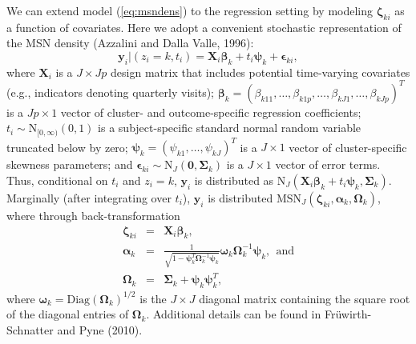 \documentclass[useAMS,referee]{biom}
\begin{document}
We can extend model (\ref{eq:msndens}) to the regression setting by modeling $\boldsymbol\zeta_{ki}$ as a function of covariates. Here we adopt a convenient stochastic representation of the MSN density (Azzalini and Dalla Valle, 1996):
\begin{equation}
\mathbf{y}_{i}|(z_i=k,t_i) = \mathbf{X}_i \boldsymbol\beta_k + t_i \boldsymbol\psi_k + \boldsymbol\epsilon_{ki}, \label{eq:msnreg}
\end{equation}
where 
$\mathbf{X}_i$ is a $J \times Jp$ design matrix that includes potential time-varying covariates (e.g., indicators denoting quarterly visits); $\boldsymbol{\beta}_k=(\beta_{k11},\ldots,\beta_{k1p},\ldots,\beta_{kJ1},\ldots,\beta_{kJp})^T$ is a $Jp\times 1$ vector of cluster- and outcome-specific regression coefficients; $t_i\sim \text{N}_{[0,\infty)}(0,1)$ is a subject-specific standard normal random variable truncated below by zero; $\boldsymbol\psi_k=(\psi_{k1},\ldots,\psi_{kJ})^T$ is a $J \times 1$ vector of cluster-specific skewness parameters; and $\boldsymbol{\epsilon}_{ki} \sim \text{N}_J(\boldsymbol0,\boldsymbol\Sigma_k)$ is a $J\times 1$ vector of error terms. Thus, conditional on $t_i$ and $z_i=k$, $\boldsymbol{y}_i$ is distributed as $\text{N}_J(\mathbf{X}_i \boldsymbol\beta_k + t_i \boldsymbol\psi_k, \boldsymbol{\Sigma}_k)$. Marginally (after integrating over $t_i$), $\mathbf{y}_i$ is distributed $\text{MSN}_J(\boldsymbol\zeta_{ki}, \boldsymbol\alpha_k, \boldsymbol\Omega_k)$, where through back-transformation 
\begin{eqnarray*}
\boldsymbol\zeta_{ki} &=& \mathbf{X}_i\boldsymbol\beta_k,\\
\boldsymbol\alpha_k &=& \frac{1}{\sqrt{1 - \boldsymbol\psi_k^T 
\boldsymbol\Omega^{-1}_k\boldsymbol\psi_k}} \boldsymbol\omega_k \boldsymbol\Omega^{-1}_k\boldsymbol\psi_k,~~\text{and}\\
\boldsymbol\Omega_k &=& \boldsymbol\Sigma_k  + \boldsymbol\psi_k \boldsymbol\psi_k^T,
\end{eqnarray*}
where $\boldsymbol\omega_k = \text{Diag}(\boldsymbol\Omega_k)^{1/2}$ is the $J \times J$ diagonal matrix containing the square root of the diagonal entries of $\boldsymbol\Omega_k$. Additional details can be found in Fr\"{u}wirth-Schnatter and Pyne (2010). 
\end{document}
